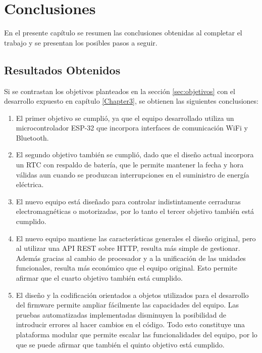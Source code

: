 \chapter{Conclusiones}
\label{Chapter5}

En el presente capítulo se resumen las conclusiones obtenidas al completar el trabajo y se presentan los posibles pasos a seguir.

\section{Resultados Obtenidos}

Si se contrastan los objetivos planteados en la sección \ref{sec:objetivos} con el desarrollo expuesto en capítulo \ref{Chapter3}, se obtienen las siguientes conclusiones:

\begin{enumerate}
	\item El primer objetivo se cumplió, ya que el equipo desarrollado utiliza un microcontrolador ESP-32 que incorpora interfaces de comunicación WiFi y Bluetooth.
	
	\item El segundo objetivo también se cumplió, dado que el diseño actual incorpora un RTC con respaldo de batería, que le permite mantener la fecha y hora válidas aun cuando se produzcan interrupciones en el suministro de energía eléctrica.
	
	\item El nuevo equipo está diseñado para controlar indistintamente cerraduras electromagnéticas o motorizadas, por lo tanto el tercer objetivo también está cumplido.
	
	\item El nuevo equipo mantiene las características generales el diseño original, pero al utilizar una API REST sobre HTTP, resulta más simple de gestionar. Además gracias al cambio de procesador y a la unificación de las unidades funcionales, resulta más económico que el equipo original. Esto permite afirmar que el cuarto objetivo también está cumplido.
	
	\item El diseño y la codificación orientados a objetos utilizados para el desarrollo del firmware permite ampliar fácilmente las capacidades del equipo. Las pruebas automatizadas implementadas disminuyen la posibilidad de introducir errores al hacer cambios en el código. Todo esto constituye una plataforma modular que permite escalar las funcionalidades del equipo, por lo que se puede afirmar que también el quinto objetivo está cumplido.
\end{enumerate}

